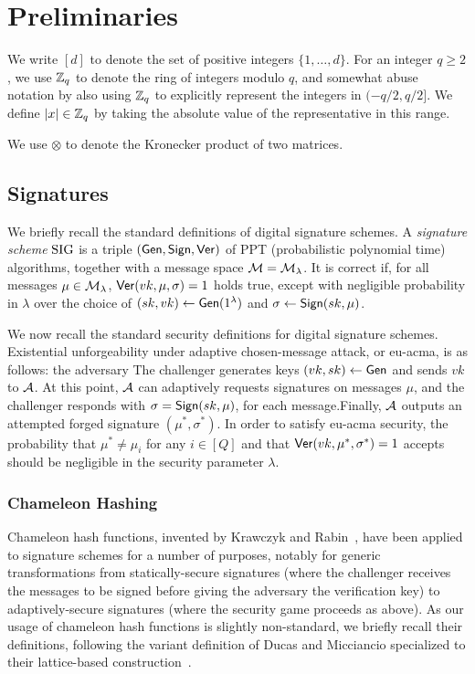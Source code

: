\section{Preliminaries}
We write $[d]$  to denote the set of positive integers $\{1,
\ldots, d\}$. For an integer $q\geq 2$, we use $\mathbb{Z}_q$ to denote the
ring of integers modulo $q$, and somewhat abuse notation by also using
$\mathbb{Z}_q$ to explicitly represent the
integers in $(-q/2,q/2]$. We define $\lvert x\rvert \in \mathbb{Z}_q$ by taking the
absolute value of the representative in this range. 

We use $\otimes$ to denote the Kronecker product of two matrices. 

\subsection{Signatures}
\label{sec:signatures}
We briefly recall the standard definitions of digital signature schemes.
A \emph{signature scheme} $\text{SIG}$ is a triple
$(\mathsf{Gen},\mathsf{Sign},\mathsf{Ver})$ of PPT (probabilistic polynomial time)
algorithms, together with a message space $\mathcal{M}=\mathcal{M}_{\lambda}$. It
is correct if, for all messages $\mu \in \mathcal{M}_{\lambda}$,
$\mathsf{Ver}(vk,\mu,\sigma)=1$ holds true, except with negligible
probability in $\lambda$ over the choice of $(sk,vk) \gets
\mathsf{Gen}(1^\lambda)$ and $\sigma \gets \mathsf{Sign}(sk,\mu)$. 

We now recall the standard security definitions for digital signature
schemes. Existential unforgeability under adaptive chosen-message
attack, or eu-acma, is as follows: the adversary The challenger
generates keys $(vk,sk) \gets \mathsf{Gen}$ and sends $vk$ to $\mathcal{A}$. At
this point, $\mathcal{A}$ can adaptively requests signatures on messages
$\mu$, and the challenger responds with $\sigma=\mathsf{Sign}(sk,\mu)$, for
each message.Finally,
  $\mathcal{A}$ outputs an attempted forged signature $(\mu^*, \sigma^*)$. In
  order to satisfy eu-acma security, the probability that $\mu^* \neq
  \mu_i$ for any $i \in [Q]$ and that
  $\mathsf{Ver}(vk,\mu^*,\sigma^*)=1$ accepts should be negligible in the
  security parameter $\lambda$. 

\subsubsection{Chameleon Hashing}
\label{sec:chameleon-hashing}


Chameleon hash functions, invented by Krawczyk and Rabin~\cite{DBLP:conf/ndss/KrawczykR00}, have been applied to signature
schemes for a number of purposes, notably for generic transformations
from statically-secure signatures (where the challenger receives the
messages to be signed before giving the adversary the verification
key) to adaptively-secure signatures (where the security game proceeds
as above). As our usage of chameleon hash functions is slightly
non-standard, we briefly recall their definitions, following the
variant definition of Ducas
and Micciancio specialized to their lattice-based
construction~\cite{DBLP:conf/crypto/DucasM14}. 


